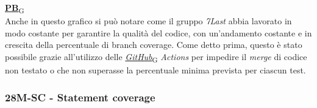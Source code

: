 \begin{flushleft}
\href{https://7last.github.io/docs/pb/documentazione-interna/glossario\#product-baseline}{\textbf{PB}\textsubscript{G}} \\
Anche in questo grafico si può notare come il gruppo \textit{7Last} abbia lavorato in modo costante per garantire la qualità del codice, con un'andamento costante e in crescita della percentuale di branch coverage. Come detto prima, questo è stato possibile grazie all'utilizzo delle \href{https://7last.github.io/docs/pb/documentazione-interna/glossario\#github}{\textit{GitHub}\textsubscript{G}}\textit{ Actions} per impedire il \textit{merge} di codice non testato o che non superasse la percentuale minima prevista per ciascun test.
\end{flushleft}

\newpage
\subsubsection{28M-SC - Statement coverage}

